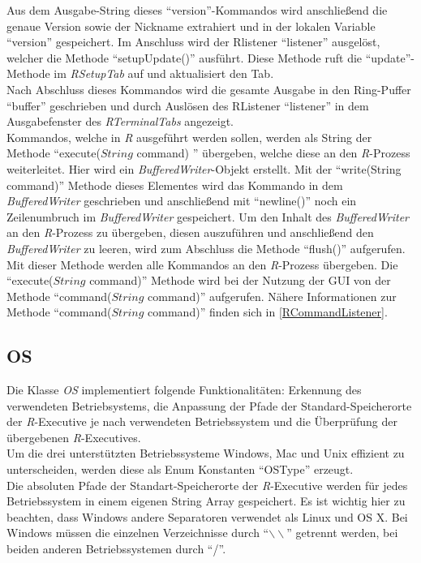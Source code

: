 \documentclass[a4paper, 12pt]{report} %
\begin{document}
Aus dem Ausgabe-String dieses "`version"'-Kommandos wird anschließend die genaue Version sowie der Nickname extrahiert und in der lokalen Variable "`version"' gespeichert. Im Anschluss wird der Rlistener  "`listener"' ausgelöst, welcher die Methode "`setupUpdate()"' ausführt. Diese Methode ruft die "`update"'-Methode im \textit{RSetupTab} auf und aktualisiert den Tab.\\

Nach Abschluss dieses Kommandos wird die gesamte Ausgabe in den Ring-Puffer "`buffer"' geschrieben und durch Auslösen des RListener "`listener"' in dem Ausgabefenster des \textit{RTerminalTabs} angezeigt.\\

Kommandos, welche in \textit{R} ausgeführt werden sollen, werden als String der Methode "`execute($String$ command) "' übergeben, welche diese an den \textit{R}-Prozess weiterleitet. Hier wird ein \textit{BufferedWriter}-Objekt erstellt. Mit der "`write(String command)"' Methode dieses Elementes wird das Kommando in dem \textit{BufferedWriter} geschrieben und anschließend mit "`newline()"' noch ein Zeilenumbruch im \textit{BufferedWriter} gespeichert. Um den Inhalt des \textit{BufferedWriter} an den \textit{R}-Prozess zu übergeben, diesen auszuführen und anschließend den \textit{BufferedWriter} zu leeren, wird zum Abschluss die Methode "`flush()"' aufgerufen.
Mit dieser Methode werden alle Kommandos an den \textit{R}-Prozess übergeben. Die "`execute($String$ command)"' Methode wird bei der Nutzung der GUI von der Methode "`command($String$ command)"' aufgerufen. Nähere Informationen zur Methode "`command($String$ command)"' finden sich in \ref{RCommandListener}.

\subsection{OS} \label{OS}

Die Klasse \textit{OS} implementiert folgende Funktionalitäten: Erkennung des verwendeten Betriebsystems, die Anpassung der Pfade der Standard-Speicherorte der \textit{R}-Executive je nach verwendeten Betriebssystem und die Überprüfung der übergebenen \textit{R}-Executives.\\

Um die drei unterstützten Betriebssysteme Windows, Mac und Unix effizient zu unterscheiden, werden diese als Enum Konstanten "`OSType"' erzeugt.\\

Die absoluten Pfade der Standart-Speicherorte der \textit{R}-Executive werden für jedes Betriebssystem in einem eigenen String Array gespeichert. Es ist wichtig hier zu beachten, dass Windows andere Separatoren verwendet als Linux und OS X.
Bei Windows müssen die einzelnen Verzeichnisse durch "`$\backslash \backslash$"' getrennt werden, bei beiden anderen Betriebssystemen durch "`/"'. 
\end{document}
